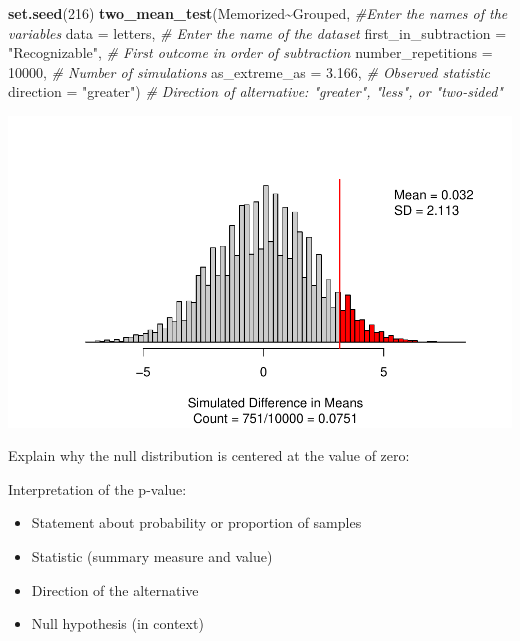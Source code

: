 \documentclass[
]{report}
\newenvironment{Shaded}{\begin{snugshade}}{\end{snugshade}}
\newcommand{\AttributeTok}[1]{\textcolor[rgb]{0.13,0.29,0.53}{#1}}
\newcommand{\CommentTok}[1]{\textcolor[rgb]{0.56,0.35,0.01}{\textit{#1}}}
\newcommand{\DecValTok}[1]{\textcolor[rgb]{0.00,0.00,0.81}{#1}}
\newcommand{\FloatTok}[1]{\textcolor[rgb]{0.00,0.00,0.81}{#1}}
\newcommand{\FunctionTok}[1]{\textcolor[rgb]{0.13,0.29,0.53}{\textbf{#1}}}
\newcommand{\NormalTok}[1]{#1}
\newcommand{\SpecialCharTok}[1]{\textcolor[rgb]{0.81,0.36,0.00}{\textbf{#1}}}
\newcommand{\StringTok}[1]{\textcolor[rgb]{0.31,0.60,0.02}{#1}}
\begin{document}
\vspace{1mm}

\begin{Shaded}
\begin{Highlighting}[]
\FunctionTok{set.seed}\NormalTok{(}\DecValTok{216}\NormalTok{)}
\FunctionTok{two\_mean\_test}\NormalTok{(Memorized}\SpecialCharTok{\textasciitilde{}}\NormalTok{Grouped, }\CommentTok{\#Enter the names of the variables}
              \AttributeTok{data =}\NormalTok{ letters,  }\CommentTok{\# Enter the name of the dataset}
              \AttributeTok{first\_in\_subtraction =} \StringTok{"Recognizable"}\NormalTok{, }\CommentTok{\# First outcome in order of subtraction}
              \AttributeTok{number\_repetitions =} \DecValTok{10000}\NormalTok{,  }\CommentTok{\# Number of simulations}
              \AttributeTok{as\_extreme\_as =} \FloatTok{3.166}\NormalTok{,  }\CommentTok{\# Observed statistic}
              \AttributeTok{direction =} \StringTok{"greater"}\NormalTok{)  }\CommentTok{\# Direction of alternative: "greater", "less", or "two{-}sided"}
\end{Highlighting}
\end{Shaded}

\begin{center}\includegraphics[width=0.7\linewidth]{12-VN12-1ofeach_files/figure-latex/unnamed-chunk-3-1} \end{center}

Explain why the null distribution is centered at the value of zero:

\vspace{0.8in}

Interpretation of the p-value:

\begin{itemize}
\item
  Statement about probability or proportion of samples
\item
  Statistic (summary measure and value)
\item
  Direction of the alternative
\item
  Null hypothesis (in context)
\end{itemize}
\end{document}
